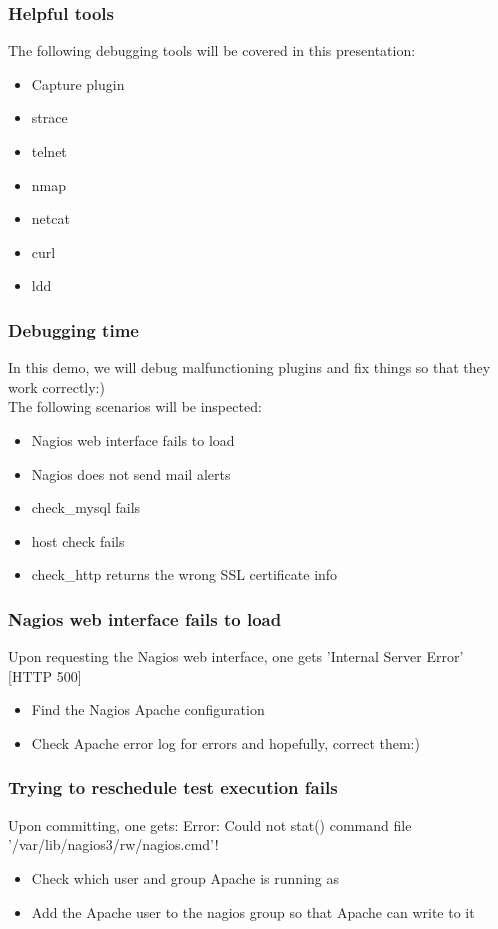 \documentclass[aspectratio=169]{beamer}
\begin{document}
\begin{frame}
\frametitle{Helpful tools}
The following debugging tools will be covered in this presentation:
\begin{itemize}
\item Capture plugin
\item strace
\item telnet
\item nmap
\item netcat
\item curl
\item ldd
\end{itemize}
\end{frame}

\begin{frame}
\frametitle{Debugging time}
In this demo, we will debug malfunctioning plugins and fix things so that they work correctly:) \\
\bigskip
The following scenarios will be inspected:
\begin{itemize}
\item Nagios web interface fails to load
\item Nagios does not send mail alerts
\item check\_mysql fails
\item host check fails
\item check\_http returns the wrong SSL certificate info
\end{itemize}

\end{frame}

\begin{frame}
\frametitle{Nagios web interface fails to load}
Upon requesting the Nagios web interface, one gets 'Internal Server Error' [HTTP 500]
\bigskip
\begin{itemize}
\item Find the Nagios Apache configuration
\item Check Apache error log for errors and hopefully, correct them:)
\end{itemize}
\end{frame}


\begin{frame}
\frametitle{Trying to reschedule test execution fails}
Upon committing, one gets: Error: Could not stat() command file '/var/lib/nagios3/rw/nagios.cmd'!
\bigskip
\begin{itemize}
\item Check which user and group Apache is running as
\item Add the Apache user to the nagios group so that Apache can write to it
\end{itemize}
\end{frame}
\end{document}
